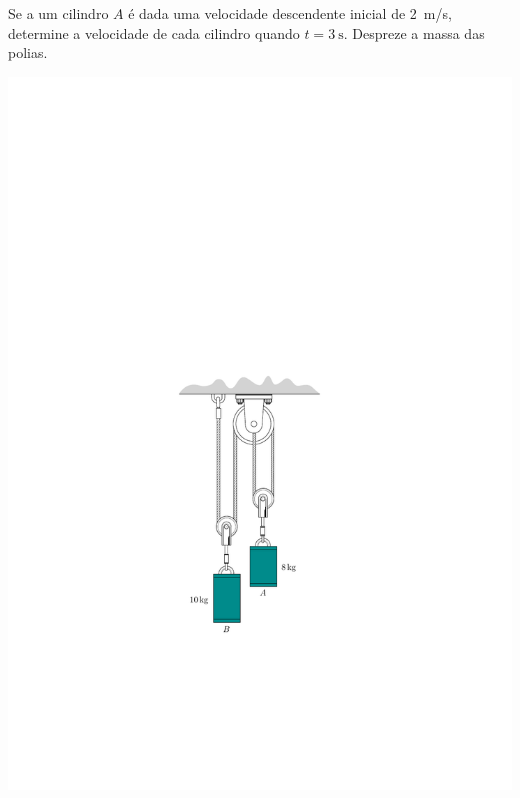 \item Se a um cilindro $A$ é dada uma velocidade descendente inicial de \SI{2}{\meter/\second}, determine a velocidade de cada cilindro quando $t=\SI{3}{\second}$. Despreze a massa das polias.


\begin{flushright}
	\includegraphics[scale=1.2]{images/draw_7}
\end{flushright}